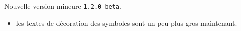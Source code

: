 Nouvelle version mineure \verb+1.2.0-beta+.

\begin{itemize}[itemsep=.5em]
    \item {}
          les textes de décoration des symboles sont un peu plus gros maintenant.
\end{itemize}


\separation
